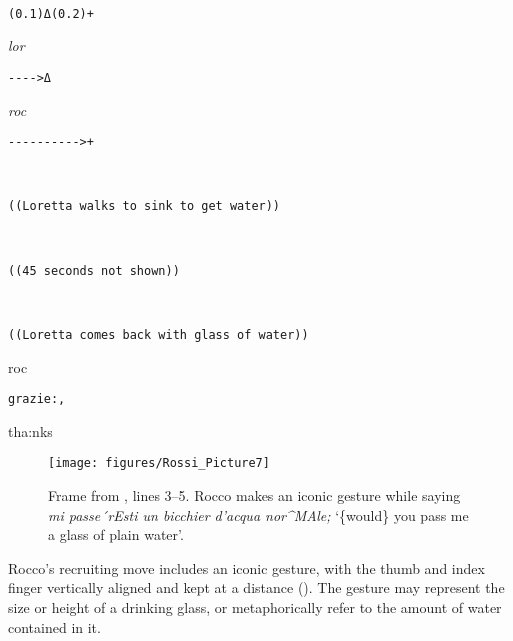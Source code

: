 \documentclass[output=paper,modfonts]{langscibook}
\begin{document}
%
\begin{transbox}{8}{~}
\begin{verbatim}
(0.1)Δ(0.2)+
\end{verbatim}
\end{transbox}
%
\begin{transbox}{9}{\textit{lor}}
\begin{verbatim}
---->Δ
\end{verbatim}
\end{transbox}
%
\begin{transbox}{10}{\textit{roc}}
\begin{verbatim}
---------->+
\end{verbatim}
\end{transbox}\vspace{0.5mm}
%
\begin{transbox}{11}{~}
\begin{verbatim}
((Loretta walks to sink to get water))
\end{verbatim}
\end{transbox}\vspace{0.75mm}
%
\begin{transbox}{~}{~}
\begin{verbatim}
((45 seconds not shown))
\end{verbatim}
\end{transbox}\vspace{0.5mm}
%
\begin{transbox}{12}{~}
\begin{verbatim}
((Loretta comes back with glass of water))
\end{verbatim}
\end{transbox}\vspace{-1.75mm}
%
\begin{transbox}{13}{roc}
\begin{verbatim}
grazie:,
\end{verbatim}
tha:nks
\end{transbox}\bigskip

\begin{figure}
\centering
\texttt{[image: figures/Rossi\_Picture7]} %
\caption{Frame from , lines 3--5. Rocco makes an iconic gesture while saying \textit{mi passe´{}rEsti un bicchier d'acqua nor\^{}MAle;} ‘\{would\} you pass me a glass of plain water’.}
\label{fig:rossi:6}
\end{figure}

Rocco's recruiting move includes an iconic gesture, with the thumb and index finger vertically aligned and kept at a distance (). The gesture may represent the size or height of a drinking glass, or metaphorically refer to the amount of water contained in it.
\end{document}
